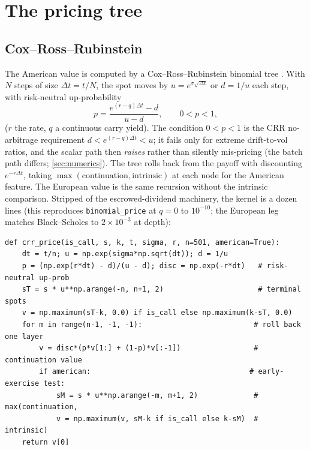 \documentclass[11pt]{article}
\begin{document}
\section{The pricing tree}
\label{sec:tree}

\subsection{Cox--Ross--Rubinstein}

The American value is computed by a Cox--Ross--Rubinstein binomial tree
\cite{CoxRossRubinstein1979}. With $N$ steps of size $\Delta t=t/N$, the spot
moves by $u=e^{\sigma\sqrt{\Delta t}}$ or $d=1/u$ each step, with risk-neutral
up-probability
\begin{equation}
p=\frac{e^{(r-q)\Delta t}-d}{u-d},\qquad 0<p<1,
\label{eq:crr_p}
\end{equation}
($r$ the rate, $q$ a continuous carry yield). The condition $0<p<1$ is the CRR
no-arbitrage requirement $d<e^{(r-q)\Delta t}<u$; it fails only for extreme
drift-to-vol ratios, and the scalar path then \emph{raises} rather than silently
mis-pricing (the batch path differs; \cref{sec:numerics}). The tree rolls back
from the payoff with discounting $e^{-r\Delta t}$, taking
$\max(\text{continuation},\text{intrinsic})$ at each node for the American
feature. The European value is the same recursion without the intrinsic
comparison. Stripped of the escrowed-dividend machinery, the kernel is a dozen
lines (this reproduces \texttt{binomial\_price} at $q=0$ to $10^{-10}$; the
European leg matches Black--Scholes to $2\times10^{-3}$ at depth):

\begin{lstlisting}[caption={The CRR backward induction with early exercise
(distilled from \texttt{core/american.py}).},label={lst:crr}]
def crr_price(is_call, s, k, t, sigma, r, n=501, american=True):
    dt = t/n; u = np.exp(sigma*np.sqrt(dt)); d = 1/u
    p = (np.exp(r*dt) - d)/(u - d); disc = np.exp(-r*dt)   # risk-neutral up-prob
    sT = s * u**np.arange(-n, n+1, 2)                      # terminal spots
    v = np.maximum(sT-k, 0.0) if is_call else np.maximum(k-sT, 0.0)
    for m in range(n-1, -1, -1):                          # roll back one layer
        v = disc*(p*v[1:] + (1-p)*v[:-1])                 # continuation value
        if american:                                     # early-exercise test:
            sM = s * u**np.arange(-m, m+1, 2)             #   max(continuation,
            v = np.maximum(v, sM-k if is_call else k-sM)  #       intrinsic)
    return v[0]
\end{lstlisting}
\end{document}
